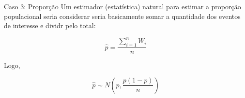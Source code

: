 












\begin{frame}{Caso 3: Proporção}
    Um estimador (estatística) natural para estimar a proporção populacional seria considerar  seria basicamente somar a quantidade dos eventos de interesse e dividr pelo total:

    $$\hat{p} = \dfrac{\sum_{i=1}^n W_i}{n}$$

    Logo, 

    $$\hat{p} \sim N\left(p, \dfrac{p(1-p)}{n}\right)$$
\end{frame}

